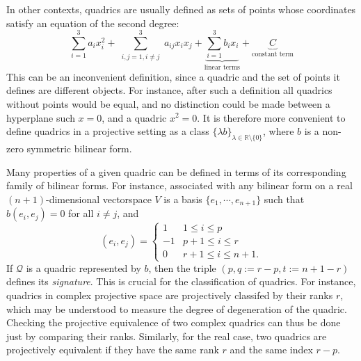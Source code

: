 \documentclass[10pt, a4paper]{article}
\theoremstyle{BoldTopSpacing}
\theoremstyle{BoldTopSpacing}
\theoremstyle{BoldTopSpacing}
\theoremstyle{BoldTopBottomSpacing}
\theoremstyle{BoldTopSpacing}
\theoremstyle{BoldTopBottomSpacing}
\theoremstyle{remark}
\begin{document}
In other contexts, quadrics are usually defined as sets of points whose coordinates satisfy an equation of the second degree:
\[
    \sum_{i = 1}^3 a_i x_i^2 + \sum_{\substack{i, j = 1, i \neq j}}^3 a_{ij} x_i x_j + \underbrace{\sum_{i = 1}^3 b_i x_i}_{\text{linear terms}} + \underbrace{C}_{\text{constant term}}
\]
This can be an inconvenient definition, since a quadric and the set of points it defines are different objects. For instance, after such a definition all quadrics without points would be equal, and no distinction could be made between a hyperplane such $x = 0$, and a quadric $x^2 = 0$. It is therefore more convenient to define quadrics in a projective setting as a class $\{ \lambda b \}_{\lambda \in \mathbb{R} \setminus \{ 0 \}}$, where $b$ is a non-zero symmetric bilinear form. \par
Many properties of a given quadric can be defined in terms of its corresponding family of bilinear forms. For instance, associated with any bilinear form on a real $(n+1)$-dimensional vectorspace $V$ is a basis $\{e_1, \cdots, e_{n+1}\}$ such that $b(e_{i}, e_{j}) = 0$ for all $i \neq j$, and
\[
(e_i, e_j) = \begin{cases}
1 & 1 \leq i \leq p \\
-1 & p+1 \leq i \leq r \\
0 & r+1 \leq i \leq n+1.
\end{cases}
\]
If $\mathcal{Q}$ is a quadric represented by $b$, then the triple $(p, q := r-p, t := n+1-r)$ defines its \textit{signature}. This is crucial for the classification of quadrics. For instance, quadrics in complex projective space are projectively classifed by their ranks $r$, which may be understood to measure the degree of degeneration of the quadric. Checking the projective equivalence of two complex quadrics can thus be done just by comparing their ranks. Similarly, for the real case, two quadrics are projectively equivalent if they have the same rank $r$ and the same index $r - p$. \par
\end{document}
